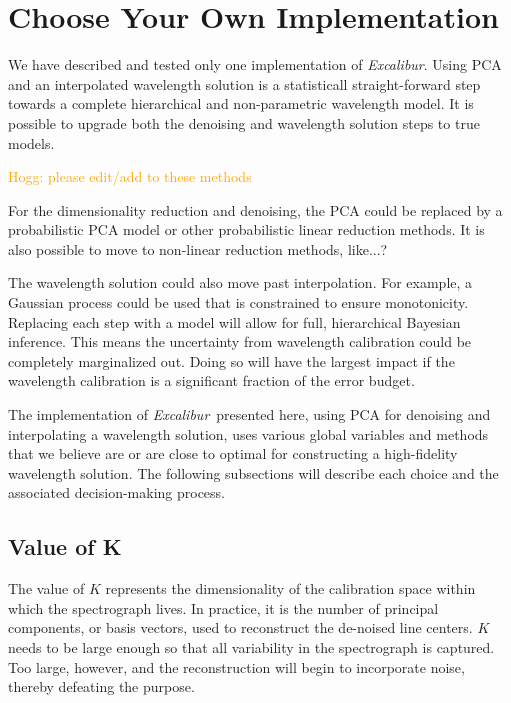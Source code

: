 \documentclass[modern]{aastex63}
\newcommand{\project}[1]{\textsl{#1}}
\newcommand{\name}{\project{Excalibur}}
\newcommand{\lz}[1]{\textcolor{orange}{#1}}
\begin{document}
\section{Choose Your Own Implementation} \label{sec:choices}
We have described and tested only one implementation of \name.  Using PCA and an interpolated wavelength solution is a statisticall straight-forward step towards a complete hierarchical and non-parametric wavelength model.  It is possible to upgrade both the denoising and wavelength solution steps to true models.

\lz{Hogg: please edit/add to these methods}

For the dimensionality reduction and denoising, the PCA could be replaced by a probabilistic PCA model or other probabilistic linear reduction methods.  It is also possible to move to non-linear reduction methods, like...?

The wavelength solution could also move past interpolation.  For example, a Gaussian process could be used that is constrained to ensure monotonicity.  Replacing each step with a model will allow for full, hierarchical Bayesian inference.  This means the uncertainty from wavelength calibration could be completely marginalized out.  Doing so will have the largest impact if the wavelength calibration is a significant fraction of the error budget.

The implementation of \name\ presented here, using PCA for denoising and interpolating a wavelength solution, uses various global variables and methods that we believe are or are close to optimal for constructing a high-fidelity wavelength solution.  The following subsections will describe each choice and the associated decision-making process.

\subsection{Value of K}
\label{sec:choice_k}
The value of $K$ represents the dimensionality of the calibration space within which the spectrograph lives.  In practice, it is the number of principal components, or basis vectors, used to reconstruct the de-noised line centers.  $K$ needs to be large enough so that all variability in the spectrograph is captured.  Too large, however, and the reconstruction will begin to incorporate noise, thereby defeating the purpose.
\end{document}
